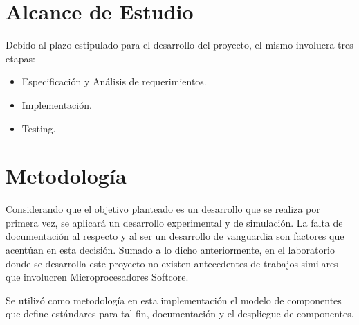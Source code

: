 
\section{Alcance de Estudio}
Debido al plazo estipulado para el desarrollo del proyecto, el mismo involucra tres etapas: 

\begin {itemize}
\item Especificación y Análisis de requerimientos.
\item Implementación.
\item Testing.
\end {itemize}


\section{Metodología}
Considerando que el objetivo planteado es un desarrollo que se realiza por primera vez, se aplicará un desarrollo experimental y de simulación. La
falta de documentación al respecto y al ser un desarrollo de vanguardia son factores que acentúan en esta decisión. Sumado a lo dicho anteriormente,
en el laboratorio donde se desarrolla este proyecto no existen antecedentes de trabajos similares que involucren Microprocesadores Softcore.


Se utilizó como metodología en esta implementación el modelo de componentes que define estándares para tal fin, documentación y el
despliegue de componentes.







